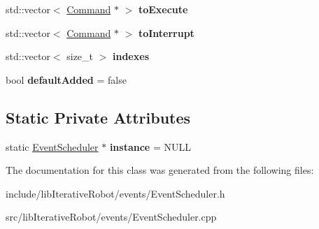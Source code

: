 \begin{DoxyCompactItemize}
\item 
\mbox{\label{classlib_iterative_robot_1_1_event_scheduler_a91ac686fb045bce48f6debdb0a351c20}} 
std\+::vector$<$ \mbox{\hyperlink{classlib_iterative_robot_1_1_command}{Command}} $\ast$ $>$ {\bfseries to\+Execute}
\item 
\mbox{\label{classlib_iterative_robot_1_1_event_scheduler_a71178c1be52c39a822b93f8bb9574fe0}} 
std\+::vector$<$ \mbox{\hyperlink{classlib_iterative_robot_1_1_command}{Command}} $\ast$ $>$ {\bfseries to\+Interrupt}
\item 
\mbox{\label{classlib_iterative_robot_1_1_event_scheduler_a1abfda2ac89947e8bb5c06478c87a5ba}} 
std\+::vector$<$ size\+\_\+t $>$ {\bfseries indexes}
\item 
\mbox{\label{classlib_iterative_robot_1_1_event_scheduler_ab621dadcaf39710a2c591c72ade16885}} 
bool {\bfseries default\+Added} = false
\end{DoxyCompactItemize}
\subsection*{Static Private Attributes}
\begin{DoxyCompactItemize}
\item 
\mbox{\label{classlib_iterative_robot_1_1_event_scheduler_a1f4587720421057eebddc0248bf9a05f}} 
static \mbox{\hyperlink{classlib_iterative_robot_1_1_event_scheduler}{Event\+Scheduler}} $\ast$ {\bfseries instance} = N\+U\+LL
\end{DoxyCompactItemize}


The documentation for this class was generated from the following files\+:\begin{DoxyCompactItemize}
\item 
include/lib\+Iterative\+Robot/events/Event\+Scheduler.\+h\item 
src/lib\+Iterative\+Robot/events/Event\+Scheduler.\+cpp\end{DoxyCompactItemize}
